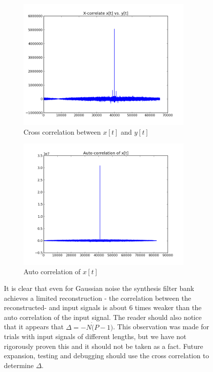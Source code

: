 \documentclass[a4paper,10pt]{article}
\begin{document}
\begin{figure}
 \begin{subfigure}{0.5\textwidth}
  \includegraphics[width=0.95\textwidth]{x_cor.png}
  \caption{Cross correlation between $x[t]$ and $y[t]$}
 \end{subfigure}
 \begin{subfigure}{0.5\textwidth}
  \includegraphics[width=0.95\textwidth]{auto_cor.png}
  \caption{Auto correlation of $x[t]$}
 \end{subfigure}
\caption[Correlation between synthesis filter bank and input]{It is clear that even for Gaussian noise the synthesis filter bank achieves a limited reconstruction - the correlation between the reconstructed- and input signals is 
about 6 times weaker than the auto correlation of the input signal. The reader should also notice that it appears that $\Delta = -N\dot (P-1)$. This observation was made for 
trials with input signals of different lengths, but we have not rigorously proven this and it should not be taken as a fact. Future expansion, testing and debugging should use
the cross correlation to determine $\Delta$.}
\label{correlation}
\end{figure}
\end{document}
